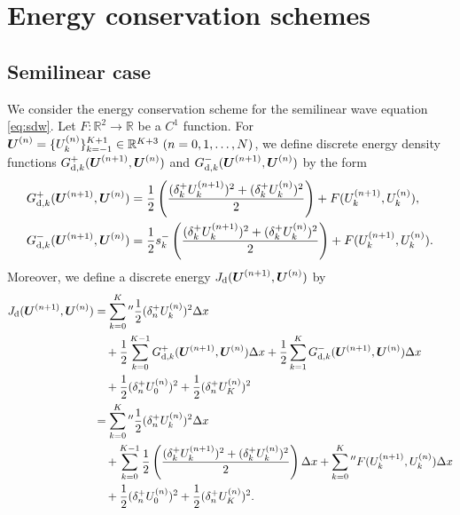 \documentclass[dvipdfmx-if-dvi,autodetect-engine,ja=standard]{amsart}
\numberwithin{equation}{section} %
\def\vect#1{\mbox{\boldmath $#1$}} %
\begin{document}
\section{Energy conservation schemes}
\subsection{Semilinear case}
We consider the energy conservation scheme
for the semilinear wave equation \eqref{eq:sdw}.
Let
$F : \mathbb{R}^2 \to \mathbb{R}$
be a
$C^1$
function.
For
$\vect{U}^{(n)} = \{ U_k^{(n)} \}_{k=-1}^{K+1} \in \mathbb{R}^{K+3} \ (n=0,1,\ldots,N)$,
we define
discrete energy density functions
$G_{\mathrm{d},k}^+ (\vect{U}^{(n+1)}, \vect{U}^{(n)})$
and
$G_{\mathrm{d},k}^- (\vect{U}^{(n+1)}, \vect{U}^{(n)})$
by the form
\begin{align}\label{eq:semi:Gdk:+}
    G_{\mathrm{d},k}^+ (\vect{U}^{(n+1)}, \vect{U}^{(n)})
    &= 
    \frac{1}{2}
    \left(
        \frac{(\delta_k^+ U_k^{(n+1)})^2 + (\delta_k^+ U_k^{(n)})^2}{2}
    \right)
    + F(U_k^{(n+1)}, U_k^{(n)}),\\
\label{eq:semi:Gdk:-}
     G_{\mathrm{d},k}^- (\vect{U}^{(n+1)}, \vect{U}^{(n)})
    &= 
    \frac{1}{2} s_k^- 
    \left(
        \frac{(\delta_k^+ U_k^{(n+1)})^2 + (\delta_k^+ U_k^{(n)})^2}{2}
    \right)
    + F(U_k^{(n+1)}, U_k^{(n)}).
\end{align}
Moreover, we define a discrete energy
$J_{\mathrm{d}}(\vect{U}^{(n+1)}, \vect{U}^{(n)})$
by
\begin{align}\label{eq:semi:J}
    J_{\mathrm{d}}(\vect{U}^{(n+1)}, \vect{U}^{(n)})
    &= \sum_{k=0}^K{}'' \frac{1}{2} (\delta_n^+ U_k^{(n)})^2 \Delta x \\
    &\quad + 
    \frac{1}{2} \sum_{k=0}^{K-1}
    G_{\mathrm{d},k}^+(\vect{U}^{(n+1)}, \vect{U}^{(n)}) \Delta x
    + \frac{1}{2} \sum_{k=1}^K
    G_{\mathrm{d},k}^- (\vect{U}^{(n+1)}, \vect{U}^{(n)}) \Delta x \\
    &\quad
    + \frac{1}{2} (\delta_n^+ U_0^{(n)})^2
    + \frac{1}{2} (\delta_n^+ U_K^{(n)})^2 \\
    &=
    \sum_{k=0}^K{}'' \frac{1}{2} (\delta_n^+ U_k^{(n)})^2 \Delta x \\
    &\quad +
    \sum_{k=0}^{K-1} 
    \frac{1}{2}
    \left(
        \frac{(\delta_k^+ U_k^{(n+1)})^2 + (\delta_k^+ U_k^{(n)})^2}{2}
    \right)
    \Delta x
    + \sum_{k=0}^K{}'' F(U_k^{(n+1)}, U_k^{(n)}) \Delta x \\
    &\quad
    + \frac{1}{2} (\delta_n^+ U_0^{(n)})^2
    + \frac{1}{2} (\delta_n^+ U_K^{(n)})^2.
\end{align}
\end{document}
